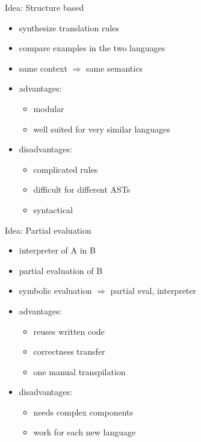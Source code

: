 \documentclass[aspectratio=169, handout]{beamer}
\begin{document}
    
    
    \begin{frame}{Idea: Structure based}
    \begin{itemize}
        \item synthesize translation rules
        \item compare examples in the two languages
        \item same context $\Rightarrow$ same semantics \pause
        \item advantages:
            \begin{itemize}
                \item modular
                \item well suited for very similar languages
            \end{itemize} \pause
        \item disadvantages: 
            \begin{itemize}
                \item complicated rules
                \item difficult for different ASTs
                \item syntactical
            \end{itemize}
    \end{itemize}
    \end{frame}
    
    \begin{frame}{Idea: Partial evaluation}
    \begin{itemize}
        \item interpreter of A in B
        \item partial evaluation of B
        \item symbolic evaluation $\Rightarrow$ partial eval, interpreter \pause
        \item advantages:
            \begin{itemize}
                \item reuses written code
                \item correctness transfer
                \item one manual transpilation
            \end{itemize} \pause
        \item disadvantages: 
            \begin{itemize}
                \item needs complex components
                \item work for each new language
            \end{itemize}
    \end{itemize}
    \end{frame}
    
\end{document}
